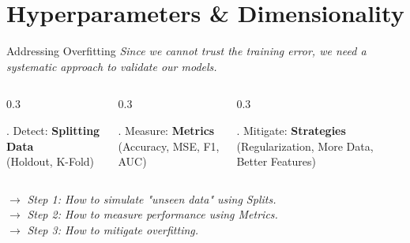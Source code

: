 \section{Hyperparameters \& Dimensionality}
\begin{frame}{Addressing Overfitting}
    \centering
    \large \textit{Since we cannot trust the training error, we need a systematic approach to validate our models.}
    
    \vspace{0.8cm}
    
    \begin{columns}[T]
        \begin{column}{0.3\textwidth}
            \begin{block}{. Detect:}
                \centering
                \textbf{Splitting Data}\\
                (Holdout, K-Fold)
            \end{block}
        \end{column}
        \begin{column}{0.3\textwidth}
            \begin{block}{. Measure:}
                \centering
                \textbf{Metrics}\\
                (Accuracy, MSE, F1, AUC)
            \end{block}
        \end{column}
        \begin{column}{0.3\textwidth}
            \begin{block}{. Mitigate:}
                \centering
                \textbf{Strategies}\\
                (Regularization, More Data, Better Features)
            \end{block}
        \end{column}
    \end{columns}
    
    \vspace{0.5cm}
    \centering
    \small $\rightarrow$ \textit{Step 1: How to simulate "unseen data" using Splits.} \\
    \small $\rightarrow$ \textit{Step 2: How to measure performance using Metrics.} \\
    \small $\rightarrow$ \textit{Step 3: How to mitigate overfitting.}
\end{frame}



